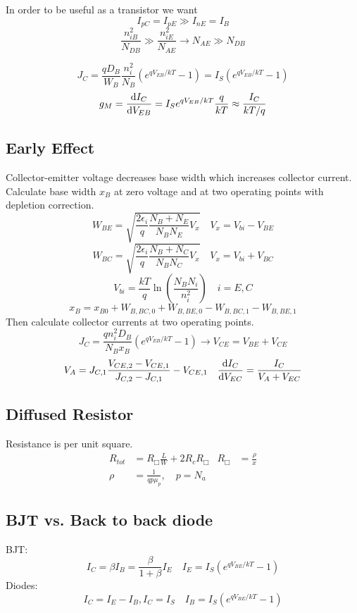 \documentclass[a4paper, fontsize=8pt, landscape, DIV=1]{scrartcl}
\begin{document}
\begin{multicols*}{4}
    In order to be useful as a transistor we want
    \[ I_{pC} = I_{pE} \gg I_{nE} = I_B \]
    \[ \frac{n_{iB}^2}{N_{DB}} \gg \frac{n_{iE}^2}{N_{AE}} \to N_{AE} \gg N_{DB} \]

    \[ J_C = \frac{qD_{B}}{W_B} \frac{n_i^2}{N_{B}} (e^{qV_{EB}/kT} - 1) = I_S(e^{qV_{EB}/kT} - 1) \]
    \[ g_M = \frac{\mathrm{d}I_C}{\mathrm{d}V_{EB}} = I_S e^{qV_{EB}/kT} \frac{q}{kT} \approx \frac{I_C}{kT/q} \]

    \subsection{Early Effect}
    Collector-emitter voltage decreases base width which increases collector current.
    Calculate base width $x_B$ at zero voltage and at two operating points with depletion correction.
    \[W_{BE} = \sqrt{\frac{2\epsilon_i}{q}\frac{N_B+N_E}{N_BN_E}V_x} \quad V_x = V_{bi}-V_{BE} \]
    \[W_{BC} = \sqrt{\frac{2\epsilon_i}{q}\frac{N_B+N_C}{N_BN_C}V_x} \quad V_x = V_{bi}+V_{BC} \]
    \[V_{bi} = \frac{kT}{q}\ln\left(\frac{N_BN_i}{n_i^2}\right) \quad i=E, C\]
    \[x_B = x_{B0} + W_{B,BC,0} + W_{B,BE,0} - W_{B,BC,1} - W_{B,BE,1} \]
    Then calculate collector currents at two operating points.
    \[J_C = \frac{qn_i^2D_B}{N_Bx_B}\left(e^{qV_{EB}/kT}-1\right) \to V_{CE} = V_{BE} + V_{CE}\]
    \[V_A = J_{C,1}\frac{V_{CE,2}-V_{CE,1}}{J_{C,2}-J_{C,1}} - V_{CE,1} \quad \frac{\mathrm{d}I_C}{\mathrm{d}V_{EC}} = \frac{I_C}{V_A + V_{EC}} \]
    
    \subsection{Diffused Resistor}

    Resistance is per unit square.
    \begin{align*}
      R_{tot} &= R_\Box\frac{L}{W} + 2R_cR_\Box & R_\Box &= \frac{\rho}{x} \\
      \rho &= \frac{1}{qp\mu_p},\quad p=N_a
    \end{align*}

    \subsection{BJT vs. Back to back diode}
    BJT: 
    \[I_C = \beta I_B = \frac{\beta}{1+\beta}I_E \quad I_E = I_S\left(e^{qV_{BE}/kT}-1\right)\]
    Diodes:
    \[I_C = I_E - I_B, I_C = I_S \quad I_B = I_S\left(e^{qV_{BE}/kT}-1\right)\]
    



\end{multicols*}
\end{document}
